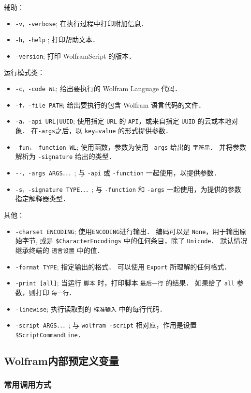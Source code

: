 辅助：
\begin{itemize}
\item \verb`-v，-verbose`; 在执行过程中打印附加信息．
\item \verb`-h，-help` ; 打印帮助文本．
\item \verb`-version`; 打印 WolframScript 的版本．
\end{itemize}
运行模式类：
\begin{itemize}
\item \verb`-c，-code WL`; 给出要执行的 Wolfram Language 代码．
\item \verb`-f，-file PATH`; 给出要执行的包含 Wolfram 语言代码的文件．
\item \verb`-a，-api URL|UUID`; 使用指定 \verb`URL` 的 \verb`API`，或来自指定 \verb`UUID` 的云或本地对象． 
在\verb`-args`之后，以 \verb`key=value` 的形式提供参数．
\item \verb`-fun，-function WL`; 使用函数，参数为使用 \verb`-args` 给出的 \verb`字符串`．
并将参数解析为 \verb`-signature` 给出的类型．
\item \verb`--，-args ARGS．．．`; 与 \verb`-api` 或 \verb`-function` 一起使用，以提供参数．
\item \verb`-s，-signature TYPE．．．`; 与 \verb`-function` 和 \verb`-args` 一起使用，为提供的参数指定解释器类型．
\end{itemize}
其他：
\begin{itemize}
\item \verb`-charset ENCODING`; 使用\verb`ENCODING`进行输出． 编码可以是 \verb`None`，用于输出原始字节,
或是 \verb`$CharacterEncodings` 中的任何条目，除了 \verb`Unicode`． 默认情况继承终端的 \verb`语言设置` 中的值．
\item \verb`-format TYPE`; 指定输出的格式． 可以使用 \verb`Export` 所理解的任何格式．
\item \verb`-print [all]`; 当运行 \verb`脚本` 时，打印脚本 \verb`最后一行` 的结果． 如果给了 \verb`all` 参数，则打印 \verb`每一行`．
\item \verb`-linewise`; 执行读取到的 \verb`标准输入` 中的每行代码．
\item \verb`-script ARGS．．．`; 与 \verb`wolfram -script` 相对应，作用是设置 \verb`$ScriptCommandLine`．
\end{itemize}

\subsection{Wolfram内部预定义变量}

\subsubsection{常用调用方式}


